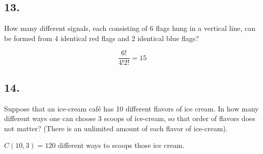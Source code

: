 \documentclass{article}
\begin{document}
\subsection*{13.}
How many different signals, each consisting of 6 flags hung in a vertical line, can be formed from
4 identical red flags and 2 identical blue flags?

$$\frac{6!}{4!2!} = 15 $$

\subsection*{14.}
Suppose that an ice-cream café has 10 different flavors of ice cream. In how many different
ways one can choose 3 scoops of ice-cream, so that order of flavors does not matter? (There is
an unlimited amount of each flavor of ice-cream).

$C(10, 3) = 120$ different ways to scoops those ice cream.
\end{document}

